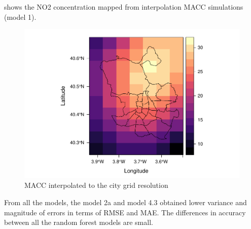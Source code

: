 \documentclass{article}
\begin{document}
 shows the NO2 concentration mapped from interpolation MACC simulations (model 1).  
\begin{figure}[tbp]
  \center
\includegraphics[scale = 0.4]{M1result.pdf}
\caption{MACC interpolated to the city grid resolution }
\label{fig:reM1}
\end{figure}

From all the models, the model 2a and model 4.3 obtained lower variance and magnitude of errors in terms of RMSE and MAE. The differences in accuracy between all the random forest models are small. 
\end{document}
